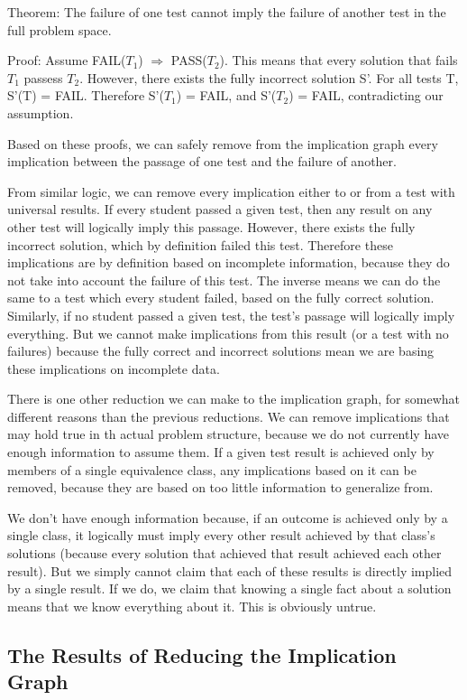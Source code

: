 \documentclass[11pt]{article}
\begin{document}
Theorem: The failure of one test cannot imply the failure of another test in the full problem space.

Proof: Assume FAIL($T_1$) $\Rightarrow$ PASS($T_2$). This means that every solution that fails $T_1$ passess $T_2$. However, there exists the fully incorrect solution S'. For all tests T, S'(T) = FAIL. Therefore S'($T_1$) = FAIL, and S'($T_2$) = FAIL, contradicting our assumption.


Based on these proofs, we can safely remove from the implication graph every implication between the passage of one test and the failure of another.

From similar logic, we can remove every implication either to or from a test with universal results. If every student passed a given test, then any result on any other test will logically imply this passage. However, there exists the fully incorrect solution, which by definition failed this test. Therefore these implications are by definition based on incomplete information, because they do not take into account the failure of this test. The inverse means we can do the same to a test which every student failed, based on the fully correct solution. Similarly, if no student passed a given test, the  test's passage will logically imply everything. But we cannot make implications  from this result (or a test with no failures) because the fully correct and incorrect solutions mean we are basing these implications on incomplete data.

There is one other reduction we can make to the implication graph, for somewhat different reasons than the previous reductions. We can remove implications that may hold true in th actual problem structure, because we do not currently have enough information to assume them. If a given test result is achieved only by members of a single equivalence class, any implications based on it can be removed, because they are based on too little information to generalize from.

We don't have enough information because, if an outcome is achieved only by a single class, it logically must imply every other result achieved by that class's solutions (because every solution that achieved that result achieved each other result). But we simply cannot claim that each of these results is directly implied by a single result. If we do, we claim that knowing a single fact about a solution means that we know everything about it. This is obviously untrue.

\subsection{The Results  of Reducing the Implication Graph}
\end{document}
